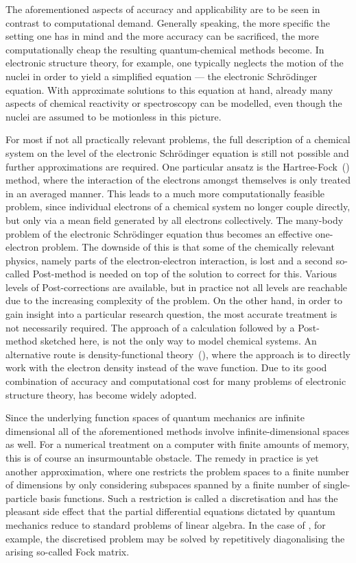 The aforementioned aspects of accuracy and applicability
are to be seen in contrast to computational demand.
Generally speaking, the more specific the setting one has in mind
and the more accuracy can be sacrificed,
the more computationally cheap the resulting quantum-chemical methods become.
In electronic structure theory, for example,
one typically neglects the motion of the nuclei
in order to yield a simplified equation --- the electronic Schrödinger equation.
With approximate solutions to this equation
at hand, already many aspects of chemical reactivity or spectroscopy
can be modelled, even though the nuclei are assumed to be motionless in this picture.

For most if not all practically relevant problems,
the full description of a chemical system
on the level of the electronic Schrödinger equation is still not possible
and further approximations are required.
One particular ansatz is the Hartree-Fock~(\HF) method,
where the interaction of the electrons amongst themselves
is only treated in an averaged manner.
This leads to a much more computationally feasible problem,
since individual electrons of a chemical system no longer couple directly,
but only via a mean field generated by all electrons collectively.
The many-body problem of the electronic Schrödinger equation
thus becomes an effective one-electron problem.
The downside of this is that some of the chemically relevant physics,
namely parts of the electron-electron interaction, is lost
and a second so-called Post-\HF method is needed
on top of the \HF solution to correct for this.
Various levels of Post-\HF corrections are available,
but in practice not all levels are reachable due to the
increasing complexity of the problem.
On the other hand, in order to gain insight
into a particular research question,
the most accurate treatment is not necessarily required.
The approach of a \HF calculation followed by a Post-\HF method sketched here,
is not the only way to model chemical systems.
An alternative route is density-functional theory~(\DFT),
where the approach is to directly work with the electron density
instead of the wave function.
Due to its good combination of accuracy and computational cost
for many problems of electronic structure theory,
\DFT has become widely adopted.

Since the underlying function spaces of quantum mechanics are infinite dimensional
all of the aforementioned methods
involve infinite-dimensional spaces as well.
For a numerical treatment on a computer with finite amounts of memory,
this is of course an insurmountable obstacle.
The remedy in practice is yet another approximation,
where one restricts the problem spaces
to a finite number of dimensions by only considering subspaces
spanned by a finite number of single-particle basis functions.
Such a restriction is called a discretisation
and has the pleasant side effect that the partial differential equations
dictated by quantum mechanics
reduce to standard problems of linear algebra.
In the case of \HF, for example,
the discretised problem may be solved by repetitively diagonalising
the arising so-called Fock matrix.

